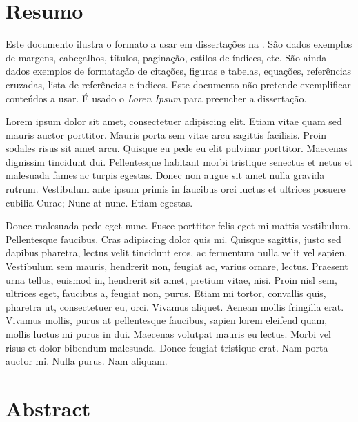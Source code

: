 

\chapter*{Resumo}

Este documento ilustra o formato a usar em dissertações na \Feup.
São dados exemplos de margens, cabeçalhos, títulos, paginação, estilos
de índices, etc. 
São ainda dados exemplos de formatação de citações, figuras e tabelas,
equações, referências cruzadas, lista de referências e índices.
Este documento não pretende exemplificar conteúdos a usar. 
É usado o \emph{Loren Ipsum} para preencher a dissertação.

Lorem ipsum dolor sit amet, consectetuer adipiscing elit. Etiam vitae
quam sed mauris auctor porttitor. Mauris porta sem vitae arcu sagittis
facilisis. Proin sodales risus sit amet arcu. Quisque eu pede eu elit
pulvinar porttitor. Maecenas dignissim tincidunt dui. Pellentesque
habitant morbi tristique senectus et netus et malesuada fames ac
turpis egestas. Donec non augue sit amet nulla gravida
rutrum. Vestibulum ante ipsum primis in faucibus orci luctus et
ultrices posuere cubilia Curae; Nunc at nunc. Etiam egestas. 

Donec malesuada pede eget nunc. Fusce porttitor felis eget mi mattis
vestibulum. Pellentesque faucibus. Cras adipiscing dolor quis
mi. Quisque sagittis, justo sed dapibus pharetra, lectus velit
tincidunt eros, ac fermentum nulla velit vel sapien. Vestibulum sem
mauris, hendrerit non, feugiat ac, varius ornare, lectus. Praesent
urna tellus, euismod in, hendrerit sit amet, pretium vitae,
nisi. Proin nisl sem, ultrices eget, faucibus a, feugiat non,
purus. Etiam mi tortor, convallis quis, pharetra ut, consectetuer eu,
orci. Vivamus aliquet. Aenean mollis fringilla erat. Vivamus mollis,
purus at pellentesque faucibus, sapien lorem eleifend quam, mollis
luctus mi purus in dui. Maecenas volutpat mauris eu lectus. Morbi vel
risus et dolor bibendum malesuada. Donec feugiat tristique erat. Nam
porta auctor mi. Nulla purus. Nam aliquam. 


\chapter*{Abstract}

